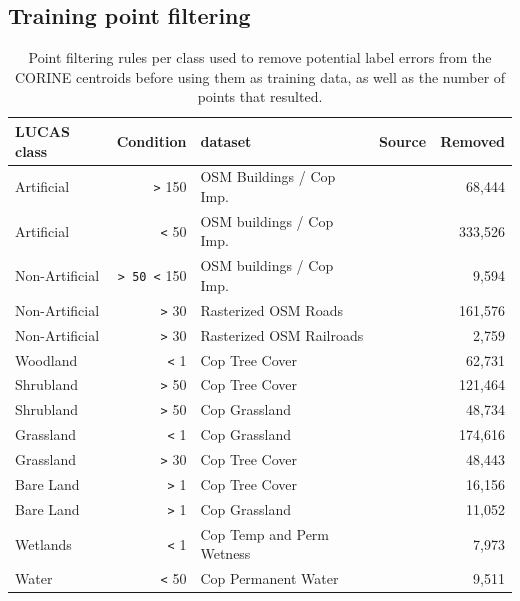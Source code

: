     \subsection*{Training point filtering}
    \label{tab:corine_filtering}
    \begin{table}[H]
    \caption{Point filtering rules per class used to remove potential label errors from the CORINE centroids before using them as training data, as well as the number of points that resulted.}
    
    \begin{tabular}{lrlrr}
    \hline
    LUCAS class    & Condition  & dataset                                      & Source & Removed \\
    \hline
    Artificial     & \verb|>| 150    & OSM Buildings / Cop Imp.  & \citep{witjes2022spatiotemporal}       & 68,444  \\
    Artificial     & \verb|<| 50     & OSM buildings / Cop Imp.  & \citep{witjes2022spatiotemporal}       & 333,526 \\
    Non-Artificial & \verb|> 50 <| 150 & OSM buildings / Cop Imp.  & \citep{witjes2022spatiotemporal}       & 9,594   \\
    Non-Artificial & \verb|>| 30     & Rasterized OSM Roads                       & \citep{witjes2022spatiotemporal}       & 161,576 \\
    Non-Artificial & \verb|>| 30     & Rasterized OSM Railroads                   & \citep{witjes2022spatiotemporal}       & 2,759   \\
    Woodland       & \verb|<| 1      & Cop Tree Cover                      &   \citep{copernicus2023hrl}      & 62,731  \\
    Shrubland      & \verb|>| 50     & Cop Tree Cover                      &  \citep{copernicus2023hrl}       & 121,464 \\
    Shrubland      & \verb|>| 50     & Cop Grassland                       &  \citep{copernicus2023hrl}       & 48,734  \\
    Grassland      & \verb|<| 1      & Cop Grassland                       &  \citep{copernicus2023hrl}       & 174,616 \\
    Grassland      & \verb|>| 30     & Cop Tree Cover                      &  \citep{copernicus2023hrl}       & 48,443  \\
    Bare Land      & \verb|>| 1      & Cop Tree Cover                      &  \citep{copernicus2023hrl}       & 16,156  \\
    Bare Land      & \verb|>| 1      & Cop Grassland                       &  \citep{copernicus2023hrl}       & 11,052  \\
    Wetlands       & \verb|<| 1      & Cop Temp and Perm Wetness &  \citep{copernicus2023hrl}       & 7,973   \\
    Water          & \verb|<| 50     & Cop Permanent Water                 &  \citep{copernicus2023hrl}       & 9,511 \\
    \hline
    \end{tabular}
    \end{table}
    
